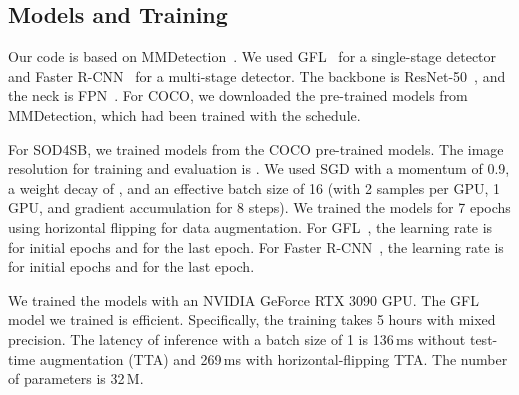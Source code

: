 \documentclass{mva_style}
\newcommand{\M}{\,M\xspace}
\newcommand{\MSEC}{\,ms\xspace}
\begin{document}
\subsection{Models and Training}

Our code is based on MMDetection~\cite{MMDetection}.
We used GFL~\cite{GFL_NeurIPS2020} for a single-stage detector
and Faster R-CNN~\cite{Faster_R-CNN_NIPS2015} for a multi-stage detector.
The backbone is ResNet-50~\cite{ResNet_CVPR2016}, and the neck is FPN~\cite{FPN_CVPR2017}.
For COCO, we downloaded the pre-trained models from MMDetection, which had been trained with the  schedule.

For SOD4SB, we trained models from the COCO pre-trained models.
The image resolution for training and evaluation is .
We used SGD with a momentum of 0.9, a weight decay of , and an effective batch size of 16 (with 2 samples per GPU, 1 GPU, and gradient accumulation for 8 steps).
We trained the models for 7 epochs using horizontal flipping for data augmentation.
For GFL~\cite{GFL_NeurIPS2020}, the learning rate is  for initial epochs and  for the last epoch.
For Faster R-CNN~\cite{Faster_R-CNN_NIPS2015}, the learning rate is  for initial epochs and  for the last epoch.

We trained the models with an NVIDIA GeForce RTX 3090 GPU.
The GFL model we trained is efficient.
Specifically, the training takes 5 hours with mixed precision.
The latency of inference with a batch size of 1 is 136\MSEC without test-time augmentation (TTA) and 269\MSEC with horizontal-flipping TTA.
The number of parameters is 32\M.




\begin{table}[t]
	\setlength{\tabcolsep}{1.4mm}
	\caption{
		Standard metrics on SOD4SB.
	}
	\vspace{-2mm}
	\begin{center}
		\label{tab:sod4sb_results}
	\end{center}
\end{table}
\end{document}
